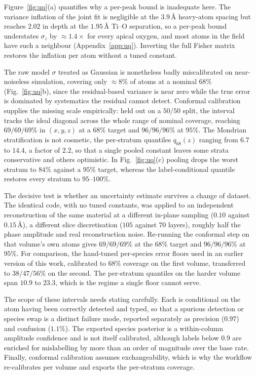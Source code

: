 \documentclass[aps,prb,twocolumn,superscriptaddress,floatfix,nofootinbib]{revtex4-2}
\begin{document}
Figure~\ref{fig:uq}(a) quantifies why a per-peak bound is inadequate here. The variance
inflation of the joint fit is negligible at the $3.9$\,\AA{} heavy-atom spacing but reaches
$2.02$ in depth at the $1.95$\,\AA{} Ti--O separation, so a per-peak bound understates
$\sigma_z$ by $\approx1.4\times$ for every apical oxygen, and most atoms in the field have such a
neighbour (Appendix~\ref{app:uq}). Inverting the full Fisher matrix restores the inflation per
atom without a tuned constant.

The raw model $\sigma$ treated as Gaussian is nonetheless badly miscalibrated on near-noiseless
simulation, covering only $\approx8\%$ of atoms at a nominal $68\%$ (Fig.~\ref{fig:uq}b), since
the residual-based variance is near zero while the true error is dominated by systematics the
residual cannot detect. Conformal calibration supplies the missing scale empirically: held out
on a $50/50$ split, the interval tracks the ideal diagonal across the whole range of nominal
coverage, reaching $69/69/69\%$ in $(x,y,z)$ at a $68\%$ target and $96/96/96\%$ at $95\%$. The
Mondrian stratification is not cosmetic, the per-stratum quantiles $q_{68}(z)$ ranging from
$6.7$ to $14.4$, a factor of $2.2$, so that a single pooled constant leaves some strata
conservative
and others optimistic. In Fig.~\ref{fig:uq}(c) pooling drops the worst stratum to $84\%$ against
a $95\%$ target, whereas the label-conditional quantile restores every stratum to $95$--$100\%$.

The decisive test is whether an uncertainty estimate survives a change of dataset. The identical
code, with no tuned constants, was applied to an independent reconstruction of the same material
at a different in-plane sampling ($0.10$ against $0.15$\,\AA), a different slice discretisation
($105$ against $70$ layers), roughly half the phase amplitude and real reconstruction noise.
Re-running the conformal step on that volume's own atoms gives $69/69/69\%$ at the $68\%$ target
and $96/96/96\%$ at $95\%$. For comparison, the hand-tuned per-species error floors used in an
earlier version of this work, calibrated to $68\%$ coverage on the first volume, transferred to
$38/47/56\%$ on the second. The per-stratum quantiles on the harder volume span $10.9$ to
$23.3$, which is the regime a single floor cannot serve.

The scope of these intervals needs stating carefully. Each is conditional on the atom having
been correctly detected and typed, so that a spurious detection or species swap is a distinct
failure mode, reported separately as precision ($0.97$) and confusion ($1.1\%$). The exported species
posterior is a within-column amplitude confidence and is not itself calibrated, although labels
below $0.9$ are enriched for mislabelling by more than an order of magnitude over the base rate.
Finally, conformal calibration assumes exchangeability, which is why the workflow re-calibrates
per volume and exports the per-stratum coverage.
\end{document}
